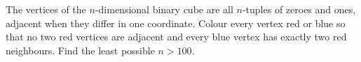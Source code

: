 The vertices of the $n$-dimensional binary cube are all $n$-tuples of zeroes and ones, adjacent when they differ in one coordinate. Colour every vertex red or blue so that no two red vertices are adjacent and every blue vertex has exactly two red neighbours. Find the least possible $n>100$.
